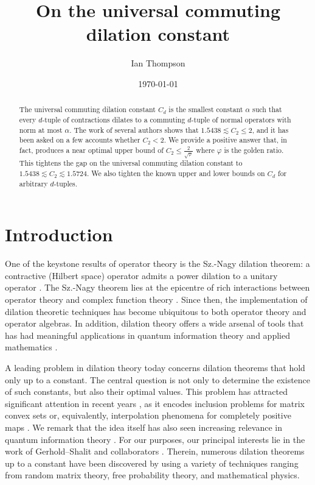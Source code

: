 \documentclass[10pt]{amsart}
\date{\today}
\author{Ian Thompson}
\title[The universal commuting dilation constant]{On the universal commuting dilation constant}
\renewcommand{\phi}{\varphi}
\begin{document}
\begin{abstract}
    The universal commuting dilation constant $C_d$ is the smallest constant $\alpha$ such that every $d$-tuple of contractions dilates to a commuting $d$-tuple of normal operators with norm at most $\alpha$. The work of several authors shows that $1.5438 \lesssim C_2\leq 2$, and it has been asked on a few accounts whether $C_2<2$. We provide a positive answer that, in fact, produces a near optimal upper bound of $C_2 \leq \frac{2}{\sqrt{\phi}}$ where $\phi$ is the golden ratio. This tightens the gap on the universal commuting dilation constant to $1.5438 \lesssim C_2 \lesssim 1.5724$. We also tighten the known upper and lower bounds on $C_d$ for arbitrary $d$-tuples.
\end{abstract}
\maketitle


\section{Introduction}\label{s:intro}

One of the keystone results of operator theory is the Sz.-Nagy dilation theorem: a contractive (Hilbert space) operator admits a power dilation to a unitary operator \cite{sznagy1954contractions}. The Sz.-Nagy theorem lies at the epicentre of rich interactions between operator theory and complex function theory \cites{agler2002pick,nagy2010harmonic}. Since then, the implementation of dilation theoretic techniques has become ubiquitous to both operator theory and operator algebras. In addition, dilation theory offers a wide arsenal of tools that has had meaningful applications in quantum information theory \cites{chakraborty2019power,de2020quantum, hu2020quantum, manvcinska2024constant} and applied mathematics \cites{ben2002tractable, clouatre2025lifting, helton2019dilations, li2024simple}.

A leading problem in dilation theory today concerns dilation theorems that hold only up to a constant. The central question is not only to determine the existence of such constants, but also their optimal values. This problem has attracted significant attention in recent years \cites{gerhold2021dilations, gerhold2022dilations, gerhold2025empirical}, as it encodes inclusion problems for matrix convex sets or, equivalently, interpolation phenomena for completely positive maps \cites{passer2018minimal, passer2019shape, davidson2017dilations, fritz2017spectrahedral}. We remark that the idea itself has also seen increasing relevance in quantum information theory \cites{bluhm2018joint, bluhm2020compatibility, bluhm2023polytope, bluhm2025inclusion, bluhm2022incompatibility}. For our purposes, our principal interests lie in the work of Gerhold--Shalit and collaborators \cites{gerhold2021dilations, gerhold2022dilations, gerhold2025empirical}. Therein, numerous dilation theorems up to a constant have been discovered by using a variety of techniques ranging from random matrix theory, free probability theory, and mathematical physics.
\end{document}
